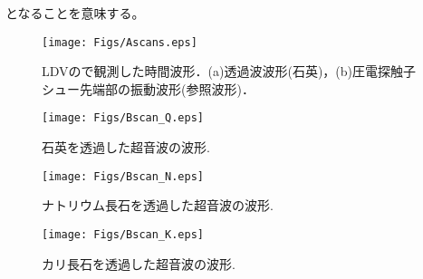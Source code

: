 となることを意味する。
\begin{figure}
\begin{center}
	\texttt{[image: Figs/Ascans.eps]}
\caption{
	LDVので観測した時間波形．(a)透過波波形(石英)，(b)圧電探触子シュー先端部の振動波形(参照波形)．
}
\label{fig:fig5}
\end{center}
\end{figure}
\begin{figure}
\begin{center}
	\texttt{[image: Figs/Bscan\_Q.eps]}
	\caption{石英を透過した超音波の波形.}
	\label{fig:fig6}
\end{center}
\end{figure}
\begin{figure}
\begin{center}
	\texttt{[image: Figs/Bscan\_N.eps]}
	\caption{ナトリウム長石を透過した超音波の波形.}
	\label{fig:fig7}
\end{center}
\end{figure}
\begin{figure}
\begin{center}
	\texttt{[image: Figs/Bscan\_K.eps]}
	\caption{カリ長石を透過した超音波の波形.}
	\label{fig:fig8}
\end{center}
\end{figure}
